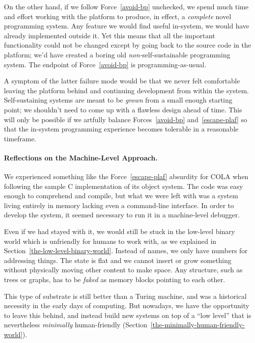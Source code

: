 \documentclass[ twoside,openright,titlepage,numbers=noenddot,headinclude,footinclude,cleardoublepage=empty,abstract=on,
                BCOR=5mm,paper=a4,fontsize=11pt
                ]{scrreprt}
\newcommand{\tomas}[1]{}
\theoremstyle{definition}
\begin{document}
On the other hand, if we follow Force~\ref{avoid-bp} unchecked, we spend
much time and effort working with the platform to produce, in effect, a
\emph{complete} novel programming system. Any feature we would find
useful in-system, we would have already implemented outside it. Yet this
means that all the important functionality could not be changed except
by going back to the source code in the platform; we'd have created a
boring old \emph{non-}self-sustainable programming system. The endpoint
of Force~\ref{avoid-bp} is programming-as-usual.

A symptom of the latter failure mode would be that we never felt
comfortable leaving the platform behind and continuing development from
within the system. Self-sustaining systems are meant to be \emph{grown}
from a small enough starting point; we shouldn't need to come up with a
flawless design ahead of time. This will only be possible if we artfully
balance Forces~\ref{avoid-bp} and~\ref{escape-plaf} so that the
in-system programming experience becomes tolerable in a reasonable
timeframe.

\paragraph{Reflections on the Machine-Level Approach.}

We experienced something like the Force~\ref{escape-plaf} absurdity for
\ac{COLA} when following the sample C implementation of its object
system. The code was easy enough to comprehend and compile, but what we
were left with was a system living entirely in memory lacking even a
command-line interface. In order to develop the system, it seemed
necessary to run it in a machine-level debugger.

\tomas{I wonder though if this is partly over-simplicity on the platform level, not substrate?}

Even if we had stayed with it, we would still be stuck in the low-level
binary world which is unfriendly for humans to work with, as we
explained in Section~\ref{the-low-level-binary-world}. Instead of names,
we only have numbers for addressing things. The state is flat and we
cannot insert or grow something without physically moving other content
to make space. Any structure, such as trees or graphs, has to be
\emph{faked} as memory blocks pointing to each other.

This type of substrate is still better than a Turing machine, and was a
historical necessity in the early days of computing. But nowadays, we
have the opportunity to leave this behind, and instead build new systems
on top of a ``low level'' that is nevertheless \emph{minimally}
human-friendly (Section~\ref{the-minimally-human-friendly-world}).
\end{document}
